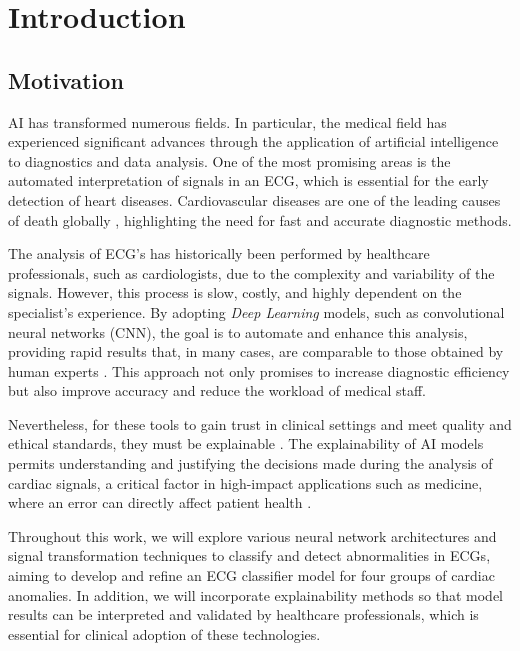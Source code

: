 \chapter*{Introduction}
\label{cap:introduction}
\section{Motivation}
AI has transformed numerous fields. In particular, the medical field has experienced significant advances through the application of artificial intelligence to diagnostics and data analysis. One of the most promising areas is the automated interpretation of signals in an ECG, which is essential for the early detection of heart diseases. Cardiovascular diseases are one of the leading causes of death globally \citep{whocvd}, highlighting the need for fast and accurate diagnostic methods.

The analysis of ECG's has historically been performed by healthcare professionals, such as cardiologists, due to the complexity and variability of the signals. However, this process is slow, costly, and highly dependent on the specialist’s experience. By adopting \emph{Deep Learning} models, such as convolutional neural networks (CNN), the goal is to automate and enhance this analysis, providing rapid results that, in many cases, are comparable to those obtained by human experts \citep{hannun_cardiologist_2019}. This approach not only promises to increase diagnostic efficiency but also improve accuracy and reduce the workload of medical staff.

Nevertheless, for these tools to gain trust in clinical settings and meet quality and ethical standards, they must be explainable \citep{Molnar2019}. The explainability of AI models permits understanding and justifying the decisions made during the analysis of cardiac signals, a critical factor in high-impact applications such as medicine, where an error can directly affect patient health \citep{Goodman2017}.

Throughout this work, we will explore various neural network architectures and signal transformation techniques to classify and detect abnormalities in ECGs, aiming to develop and refine an ECG classifier model for four groups of cardiac anomalies. In addition, we will incorporate explainability methods so that model results can be interpreted and validated by healthcare professionals, which is essential for clinical adoption of these technologies.

